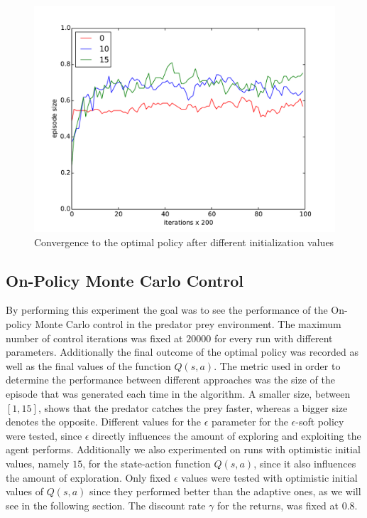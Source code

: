 \documentclass[paper=a4, fontsize=11pt]{scrartcl}
\numberwithin{equation}{section}		%
\numberwithin{figure}{section}			%
\numberwithin{table}{section}				%
\begin{document}
\begin{figure}[H] \centering
\includegraphics[scale=0.6]{optimalDifInit.pdf}
\caption{Convergence to the optimal policy after different initialization values} 
\label{figure:DivInit}
\end{figure}

\subsection{On-Policy Monte Carlo Control}
By performing this experiment the goal was to see the performance of the On-policy Monte Carlo control in the predator prey environment. The maximum number of control iterations was fixed at $20000$ for every run with different parameters. Additionally the final outcome of the optimal policy was recorded as well as the final values of the function $Q(s,a)$. The metric used in order to determine the performance between different approaches was the size of the episode that was generated each time in the algorithm. A smaller size, between $[1,15]$, shows that the predator catches the prey faster, whereas a bigger size denotes the opposite. Different values for the $\epsilon$ parameter for the $\epsilon$-soft policy were tested, since $\epsilon$ directly influences the amount of exploring and exploiting the agent performs. Additionally we also experimented on runs with optimistic initial values, namely $15$, for the state-action function $Q(s,a)$, since it also influences the amount of exploration. Only fixed $\epsilon$ values were tested with optimistic initial values of $Q(s,a)$ since they performed better than the adaptive ones, as we will see in the following section. The discount rate $\gamma$ for the returns, was fixed at 0.8.
\end{document}

